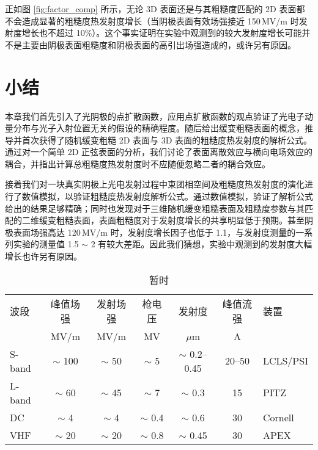 正如图 \ref{fig:factor_comp} 所示，无论 3D 表面还是与其粗糙度匹配的 2D 表面都不会造成显著的粗糙度热发射度增长（当阴极表面有效场强接近 150\,MV/m 时发射度增长也不超过 10\%）。这个事实证明在实验中观测到的较大发射度增长可能并不是主要由阴极表面粗糙度和阴极表面的高引出场强造成的，或许另有原因。

\section{小结}
本章我们首先引入了光阴极的点扩散函数，应用点扩散函数的观点验证了光电子动量分布与光子入射位置无关的假设的精确程度。随后给出缓变粗糙表面的概念，推导并首次获得了随机缓变粗糙 2D 表面与 3D 表面的粗糙度热发射度的解析公式。通过对一个简单 2D 正弦表面的分析，我们讨论了表面离散效应与横向电场效应的耦合，并指出计算总粗糙度热发射度时不应随便忽略二者的耦合效应。

接着我们对一块真实阴极上光电发射过程中束团相空间及粗糙度热发射度的演化进行了数值模拟，以验证粗糙度热发射度解析公式。通过数值模拟，验证了解析公式给出的结果足够精确；同时也发现对于三维随机缓变粗糙表面及粗糙度参数与其匹配的二维缓变粗糙表面，表面粗糙度对于发射度增长的共享明显低于预期。甚至阴极表面场强高达 120\,MV/m 时，发射度增长因子也低于 1.1，与发射度测量的一系列实验的测量值 1.5 $\sim$ 2 有较大差距。因此我们猜想，实验中观测到的发射度大幅增长也许另有原因。

\begin{table}[htbp]
\caption{暂时}
\centering
\begin{tabular}{lcccccl}
\toprule
波段 & 峰值场强 & 发射场强 & 枪电压 & 发射度 & 峰值流强 & 装置 \\
 & MV/m & MV/m & MV & $\mu$m & A & \\
\midrule
S-band & $\sim$ 100 & $\sim$ 50 & $\sim$ 5 & $\sim$ 0.2--0.45 & 20--50 & LCLS/PSI \\
L-band & $\sim$ 60 & $\sim$ 45 & $\sim$ 7 & $\sim$ 0.3 & 15 & PITZ \\
DC & $\sim$ 4 & $\sim$ 4 & $\sim$ 0.4 & $\sim$ 0.6 & 30 & Cornell \\
VHF & $\sim$ 20 & $\sim$ 20 & $\sim$ 0.8 & $\sim$ 0.45 & 30 & APEX \\
\bottomrule
\end{tabular}
\end{table}

